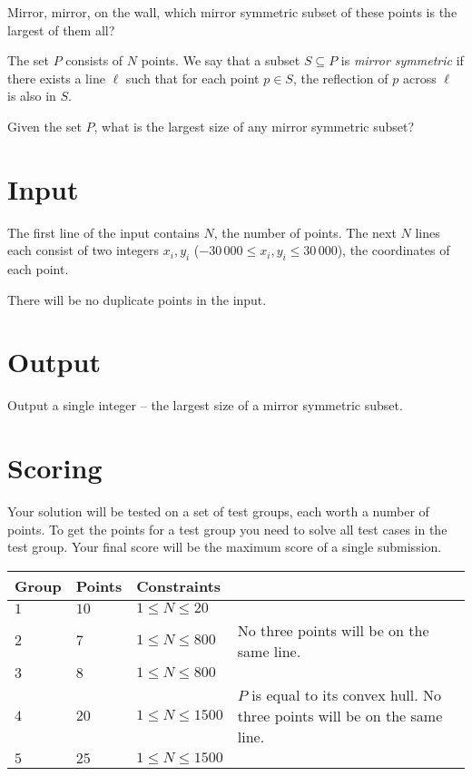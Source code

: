 Mirror, mirror, on the wall, which mirror symmetric subset of these points is the largest of them all?

The set $P$ consists of $N$ points.
We say that a subset $S \subseteq P$ is \emph{mirror symmetric} if there exists a line $\ell$ such that for each point $p \in S$, the reflection of $p$ across $\ell$ is also in $S$.

Given the set $P$, what is the largest size of any mirror symmetric subset?

\section*{Input}
The first line of the input contains $N$, the number of points.
The next $N$ lines each consist of two integers $x_i, y_i$ ($-30\,000 \le x_i, y_i \le 30\,000$), the coordinates of each point.

There will be no duplicate points in the input.

\section*{Output}
Output a single integer -- the largest size of a mirror symmetric subset.

\section*{Scoring}
Your solution will be tested on a set of test groups, each worth a number of points.
To get the points for a test group you need to solve all test cases in the test group.
Your final score will be the maximum score of a single submission.

\noindent
\begin{tabular}{| l | l | l | p{7cm} |}
\hline
Group & Points & Constraints \\ \hline
$1$   & $10$   & $1 \leq N \leq 20$ & \\ \hline
$2$   & $7$    & $1 \leq N \leq 800$ & No three points will be on the same line.\\ \hline
$3$   & $8$    & $1 \leq N \leq 800$ & \\ \hline
$4$   & $20$   & $1 \leq N \leq 1500$ & $P$ is equal to its convex hull. No three points will be on the same line.\\ \hline
$5$   & $25$   & $1 \leq N \leq 1500$ & \\ \hline
\end{tabular}
